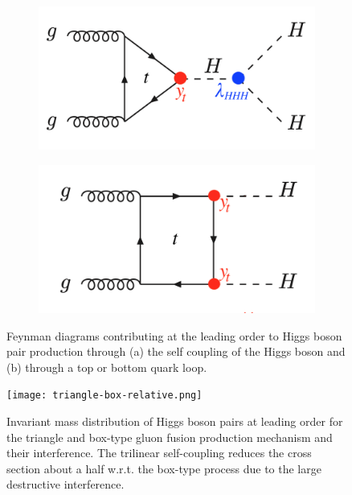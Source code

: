 \begin{figure}[ht]
        \centering
        \begin{subfigure}[b]{0.475\textwidth}
            \centering
            \includegraphics[width=\textwidth]{MSc_Thesis/fig/ggF1.png}
            \vspace{-0.5cm}
        \end{subfigure}
        \hspace{0.2cm}
        \begin{subfigure}[b]{0.475\textwidth}  
            \centering 
            \includegraphics[width=\textwidth]{MSc_Thesis/fig/ggF2.png}
            \vspace{-0.5cm}
        \end{subfigure}
        \caption[]
        {\small Feynman diagrams contributing at the leading order to Higgs boson pair production through (a) the self coupling of the Higgs boson and (b) through a top or bottom quark loop.}
        \label{ggF-HH}
\end{figure}

\begin{figure}[ht]
	\centering
	\texttt{[image: triangle-box-relative.png]}
	\caption[Invariant mass distribution of Higgs boson pairs at leading order for the triangle and box-type gluon fusion production mechanism and their interference.]{Invariant mass distribution of Higgs boson pairs at leading order for the triangle and box-type gluon fusion production mechanism and their interference. The trilinear self-coupling reduces the cross section about a half w.r.t. the box-type process due to the large destructive interference\cite{DiMicco:2690841}.}
	\label{triangle-box-relative}
\end{figure}

